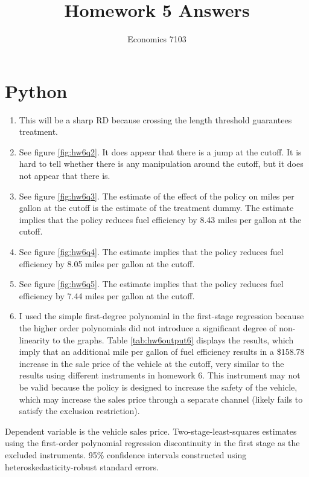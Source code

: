 \documentclass{article}
\title{Homework 5 Answers}
\author{Economics 7103}
\date{ }
\begin{document}
  
\maketitle

\section{Python}

\begin{enumerate}
    \item This will be a sharp RD because crossing the length threshold guarantees treatment. 
    \item See figure \ref{fig:hw6q2}.  It does appear that there is a jump at the cutoff.  It is hard to tell whether there is any manipulation around the cutoff, but it does not appear that there is.
    \item See figure \ref{fig:hw6q3}.  The estimate of the effect of the policy on miles per gallon at the cutoff is the estimate of the treatment dummy.  The estimate implies that the policy reduces fuel efficiency by 8.43 miles per gallon at the cutoff.
    \item See figure \ref{fig:hw6q4}.  The estimate implies that the policy reduces fuel efficiency by 8.05 miles per gallon at the cutoff.
    \item See figure \ref{fig:hw6q5}.  The estimate implies that the policy reduces fuel efficiency by 7.44 miles per gallon at the cutoff.
    \item I used the simple first-degree polynomial in the first-stage regression because the higher order polynomials did not introduce a significant degree of non-linearity to the graphs.  Table \ref{tab:hw6output6} displays the results, which imply that an additional mile per gallon of fuel efficiency results in a \$158.78 increase in the sale price of the vehicle at the cutoff, very similar to the results using different instruments in homework 6.  This instrument may not be valid because the policy is designed to increase the safety of the vehicle, which may increase the sales price through a separate channel (likely fails to satisfy the exclusion restriction).
\end{enumerate}

\begin{table}[ht]
    \centering
   
    \caption{Dependent variable is the vehicle sales price. Two-stage-least-squares estimates using the first-order polynomial regression discontinuity in the first stage as the excluded instruments.  95\% confidence intervals constructed using heteroskedasticity-robust standard errors.}
    \label{tab:hw6output6}
\end{table}
\end{document}
